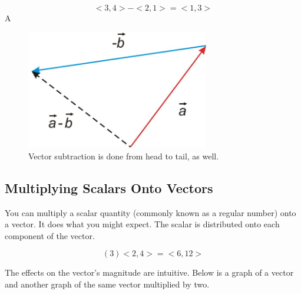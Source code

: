 \documentclass{article}
\begin{document}
$$<3, 4> - <2, 1> = <1, 3>$$A

\begin{figure}[H]
	\centering
	\includegraphics[width=8cm]{vector-subtraction}
	\caption{Vector subtraction is done from head to tail, as well.}
	\label{fig:vector-subtraction}
\end{figure}

\subsection{Multiplying Scalars Onto Vectors}
You can multiply a scalar quantity (commonly known as a regular number) onto a
vector. It does what you might expect. The scalar is distributed onto each
component of the vector.

$$(3)<2, 4> = <6, 12>$$

The effects on the vector's magnitude are intuitive. Below is a graph of a
vector and another graph of the same vector multiplied by two.
\end{document}
